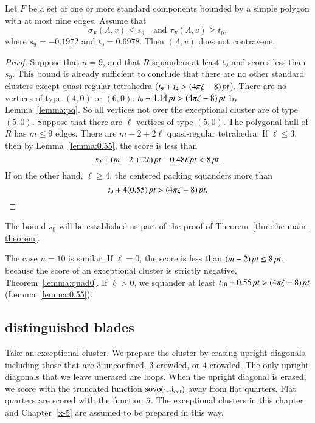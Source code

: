 \begin{lemma} \label{lemma:s9-t9}
Let $F$ be a set of one or more standard components bounded by a simple
polygon with at most nine edges.  Assume  that
    $$\sigma_F(\Lambda,v) \le s_9\quad\text{and }\tau_F(\Lambda,v)\ge t_9,$$
where $s_9=-0.1972$ and $t_9=0.6978$.  Then $(\Lambda,v)$ does not
contravene.
\end{lemma}

\begin{proof}
Suppose that $n=9$, and that $R$ squanders at least $t_9$ and
scores less than $s_9$.  This bound is already sufficient to
conclude that there are no other standard clusters except
quasi-regular tetrahedra ($t_9+t_4>(4\pi\zeta-8)\,\hbox{\it pt}$). There are no
vertices of type $(4,0)$ or $(6,0)$: $t_9+4.14\,\hbox{\it pt}>(4\pi\zeta-8)\,\hbox{\it pt}$ by
Lemma~\ref{lemma:pq}.   So all vertices not over the exceptional
cluster are of type $(5,0)$. Suppose that there are $\ell$
vertices of type $(5,0)$. The polygonal hull of $R$ has $m\le 9$
edges. There are $m-2+2\ell$ quasi-regular tetrahedra. If $\ell\le
3$, then by Lemma~\ref{lemma:0.55}, the score is less than
    $$s_9+ (m-2+2\ell)\,\hbox{\it pt} -0.48 \ell\,\hbox{\it pt} < 8\,\hbox{\it pt}.$$
If on the other hand, $\ell\ge 4$, the centered packing squanders
more than
    $$t_9+ 4(0.55)\,\hbox{\it pt} > (4\pi\zeta-8)\,\hbox{\it pt}.$$
\end{proof}


The bound $s_9$ will be established as part of the proof of
Theorem~\ref{thm:the-main-theorem}.

The case $n=10$ is similar.  If $\ell=0$, the score is less than
    $(m-2)\,\hbox{\it pt}\le 8\,\hbox{\it pt}$,
because the score of an exceptional cluster is strictly negative,
Theorem~\ref{lemma:quad0}.  If $\ell>0$, we squander at least
    $t_{10}+ 0.55\,\hbox{\it pt} > (4\pi\zeta-8)\,\hbox{\it pt}$ (Lemma~\ref{lemma:0.55}).


\subsection{distinguished blades} %

Take an exceptional cluster.  We prepare the cluster by erasing
upright diagonals, including those that are $3$-unconfined,
$3$-crowded, or $4$-crowded.  The only upright diagonals that we
leave unerased are loops.  When the upright diagonal is erased, we
score with the truncated function ${\operatorname{sovo}}(\cdot,\lambda_{oct})$ 
away from flat
quarters.  Flat quarters are scored with the function
$\hat\sigma$. The exceptional clusters in this chapter and Chapter~\ref{x-5} 
are assumed to be prepared in this way.


